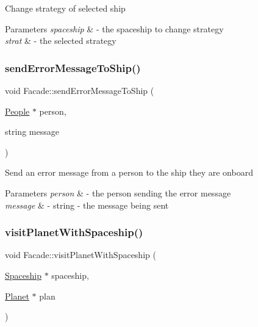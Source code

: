Change strategy of selected ship 
\begin{DoxyParams}{Parameters}
{\em spaceship} & -\/ the spaceship to change strategy \\
\hline
{\em strat} & -\/ the selected strategy \\
\hline
\end{DoxyParams}
\mbox{\label{classFacade_a91364a59aa7aedae6111ca81c01bab25}} 
\subsubsection{\texorpdfstring{send\+Error\+Message\+To\+Ship()}{sendErrorMessageToShip()}}
{\footnotesize\ttfamily void Facade\+::send\+Error\+Message\+To\+Ship (\begin{DoxyParamCaption}\item[{\hyperlink{classPeople}{People} $\ast$}]{person,  }\item[{string}]{message }\end{DoxyParamCaption})}

Send an error message from a person to the ship they are onboard 
\begin{DoxyParams}{Parameters}
{\em person} & -\/ the person sending the error message \\
\hline
{\em message} & -\/ string -\/ the message being sent \\
\hline
\end{DoxyParams}
\mbox{\label{classFacade_aebe418b146c51597d40684758830a476}} 
\subsubsection{\texorpdfstring{visit\+Planet\+With\+Spaceship()}{visitPlanetWithSpaceship()}}
{\footnotesize\ttfamily void Facade\+::visit\+Planet\+With\+Spaceship (\begin{DoxyParamCaption}\item[{\hyperlink{classSpaceship}{Spaceship} $\ast$}]{spaceship,  }\item[{\hyperlink{classPlanet}{Planet} $\ast$}]{plan }\end{DoxyParamCaption})}

